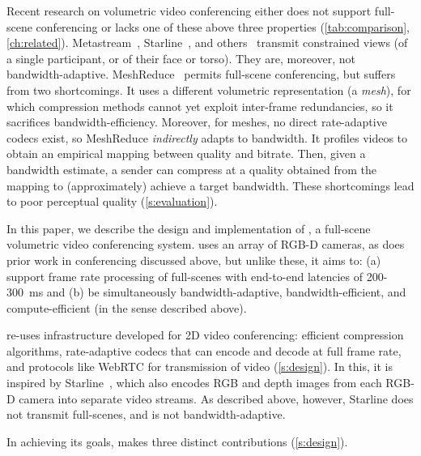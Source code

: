 %
Recent research on volumetric video conferencing either does not support full-scene conferencing or lacks one of these above three properties (\cref{tab:comparison}, \cref{ch:related}).
%
Metastream~\cite{metastream}, Starline~\cite{starline}, and others~\cite{tele-aloha, vrcomm, farfetchfusion, holoportation} transmit constrained views (of a single participant, or of their face or torso).
%
They are, moreover, not bandwidth-adaptive.
%
MeshReduce~\cite{meshreduce} permits full-scene conferencing, but suffers from two shortcomings.
%
It uses a different volumetric representation (a \textit{mesh}), for which compression methods cannot yet exploit inter-frame redundancies, so it sacrifices bandwidth-efficiency.
%
Moreover, for meshes, no direct rate-adaptive codecs exist, so MeshReduce \textit{indirectly} adapts to bandwidth.
%
It profiles videos to obtain an empirical mapping between quality and bitrate.
%
Then, given a bandwidth estimate, a sender can compress at a quality obtained from the mapping to (approximately) achieve a target bandwidth.
%
These shortcomings lead to poor perceptual quality (\cref{s:evaluation}).

%
In this paper, we describe the design and implementation of \livo{}, a full-scene volumetric video conferencing system.
%
\livo{} uses an array of RGB-D cameras, as does prior work in conferencing discussed above, but unlike these, it aims to: (a) support frame rate processing of full-scenes with end-to-end latencies of 200-300~ms and (b) be simultaneously bandwidth-adaptive, bandwidth-efficient, and compute-efficient (in the sense described above).

%
\livo re-uses infrastructure developed for 2D video conferencing: efficient compression algorithms, rate-adaptive codecs that can encode and decode at full frame rate, and protocols like WebRTC for transmission of video (\cref{s:design}).
%
In this, it is inspired by Starline~\cite{starline}, which also encodes RGB and depth images from each RGB-D camera into separate video streams.
%
As described above, however, Starline does not transmit full-scenes, and is not bandwidth-adaptive.

%
In achieving its goals, \livo{} makes three distinct contributions (\cref{s:design}).



